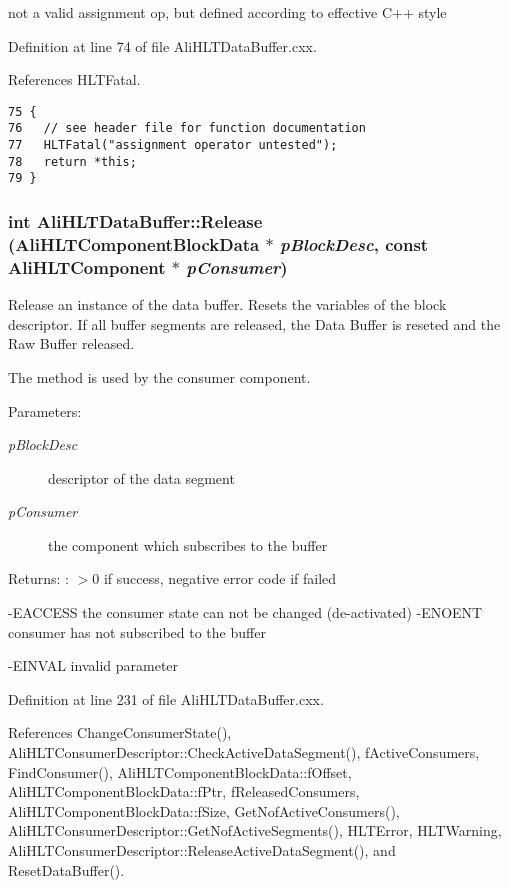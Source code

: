 not a valid assignment op, but defined according to effective C++ style 

Definition at line 74 of file Ali\-HLTData\-Buffer.cxx.

References HLTFatal.

\footnotesize\begin{verbatim}75 { 
76   // see header file for function documentation
77   HLTFatal("assignment operator untested");
78   return *this;
79 }
\end{verbatim}\normalsize 


\subsubsection{\setlength{\rightskip}{0pt plus 5cm}int Ali\-HLTData\-Buffer::Release ({\bf Ali\-HLTComponent\-Block\-Data} $\ast$ {\em p\-Block\-Desc}, const {\bf Ali\-HLTComponent} $\ast$ {\em p\-Consumer})}\label{classAliHLTDataBuffer_a7}


Release an instance of the data buffer. Resets the variables of the block descriptor. If all buffer segments are released, the Data Buffer is reseted and the Raw Buffer released.\par
 The method is used by the consumer component. \begin{Desc}
\item[Parameters:]
\begin{description}
\item[{\em p\-Block\-Desc}]descriptor of the data segment \item[{\em p\-Consumer}]the component which subscribes to the buffer \end{description}
\end{Desc}
\begin{Desc}
\item[Returns:]: $>$0 if success, negative error code if failed \par
 -EACCESS the consumer state can not be changed (de-activated) -ENOENT consumer has not subscribed to the buffer \par
 -EINVAL invalid parameter \par
 \end{Desc}


Definition at line 231 of file Ali\-HLTData\-Buffer.cxx.

References Change\-Consumer\-State(), Ali\-HLTConsumer\-Descriptor::Check\-Active\-Data\-Segment(), f\-Active\-Consumers, Find\-Consumer(), Ali\-HLTComponent\-Block\-Data::f\-Offset, Ali\-HLTComponent\-Block\-Data::f\-Ptr, f\-Released\-Consumers, Ali\-HLTComponent\-Block\-Data::f\-Size, Get\-Nof\-Active\-Consumers(), Ali\-HLTConsumer\-Descriptor::Get\-Nof\-Active\-Segments(), HLTError, HLTWarning, Ali\-HLTConsumer\-Descriptor::Release\-Active\-Data\-Segment(), and Reset\-Data\-Buffer().

